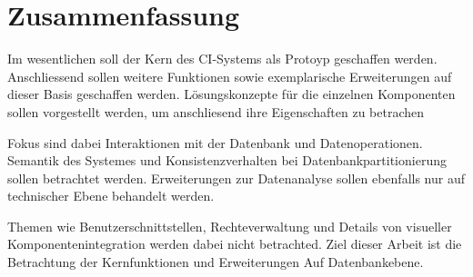 \section{Zusammenfassung}


Im wesentlichen soll der Kern des CI-Systems als Protoyp geschaffen werden.
Anschliessend sollen weitere Funktionen sowie exemplarische Erweiterungen
auf dieser Basis geschaffen werden.
L\"osungskonzepte f\"ur die einzelnen Komponenten sollen vorgestellt werden,
um anschliesend ihre Eigenschaften zu betrachen

Fokus sind dabei Interaktionen mit der Datenbank und Datenoperationen.
Semantik des Systemes und Konsistenzverhalten bei Datenbankpartitionierung
sollen betrachtet werden. Erweiterungen zur Datenanalyse sollen ebenfalls nur auf technischer Ebene behandelt werden.

Themen wie Benutzerschnittstellen, Rechteverwaltung und Details von visueller Komponentenintegration werden dabei nicht betrachted.
Ziel dieser Arbeit ist die Betrachtung der Kernfunktionen und Erweiterungen Auf Datenbankebene.


